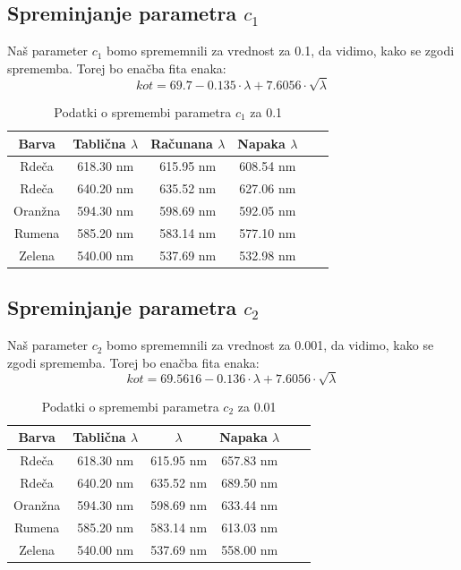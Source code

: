 \documentclass[11pt, a4paper]{article}
\theoremstyle{definition}
\theoremstyle{example}
\theoremstyle{izrek}
\begin{document}
\subsection{Spreminjanje parametra $c_1$}
Naš parameter $c_1$ bomo sprememnili za vrednost za 0.1, da vidimo, kako se zgodi sprememba.
Torej bo enačba fita enaka:
$$kot=69.7-0.135 \cdot \lambda+7.6056\cdot \sqrt{\lambda}$$
\begin{table}[H]
	\centering
	\begin{tabular}{|c|c|c|c|c|c|}
	\hline
Barva & Tablična $\lambda$ & Računana $\lambda$ & Napaka $\lambda$ \\ 
\hline
\hline
 Rdeča & 618.30 nm & 615.95 nm & 608.54 nm  \\ 
\hline
 Rdeča& 640.20 nm & 635.52 nm & 627.06 nm  \\ 
\hline
 Oranžna & 594.30 nm & 598.69 nm & 592.05 nm  \\ 
\hline
 Rumena & 585.20 nm & 583.14 nm & 577.10 nm  \\ 
\hline
 Zelena & 540.00 nm & 537.69 nm & 532.98 nm  \\ 
\hline
	\end{tabular}
	\caption{Podatki o spremembi parametra $c_1$ za 0.1}	
\end{table}

\subsection{Spreminjanje parametra $c_2$}
Naš parameter $c_2$ bomo sprememnili za vrednost za 0.001, da vidimo, kako se zgodi sprememba.
Torej bo enačba fita enaka:
$$kot=69.5616-0.136 \cdot \lambda+7.6056\cdot \sqrt{\lambda}$$
\begin{table}[H]
	\centering
	\begin{tabular}{|c|c|c|c|c|c|}
	\hline
Barva & Tablična $\lambda$ & $\lambda$ & Napaka $\lambda$ \\ 
\hline
\hline
 Rdeča & 618.30 nm & 615.95 nm & 657.83 nm  \\ 
\hline
 Rdeča & 640.20 nm & 635.52 nm & 689.50 nm  \\ 
\hline
 Oranžna & 594.30 nm & 598.69 nm & 633.44 nm  \\ 
\hline
 Rumena & 585.20 nm & 583.14 nm & 613.03 nm  \\ 
\hline
 Zelena & 540.00 nm & 537.69 nm & 558.00 nm  \\ 
\hline
\end{tabular}
	\caption{Podatki o spremembi parametra $c_2$ za 0.01}	
\end{table}
\end{document}
